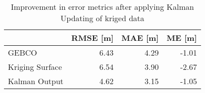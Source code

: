 \begin{table}
\centering
\caption{Improvement in error metrics after applying Kalman Updating of kriged data}
\label{tab:stcroix_gebco_raster_error}
\begin{tabular}{lrrr}
\toprule
 & RMSE [m] & MAE [m] & ME [m] \\
\midrule
GEBCO & 6.43 & 4.29 & -1.01 \\
Kriging Surface & 6.54 & 3.90 & -2.67 \\
Kalman Output & 4.62 & 3.15 & -1.05 \\
\bottomrule
\end{tabular}
\end{table}

